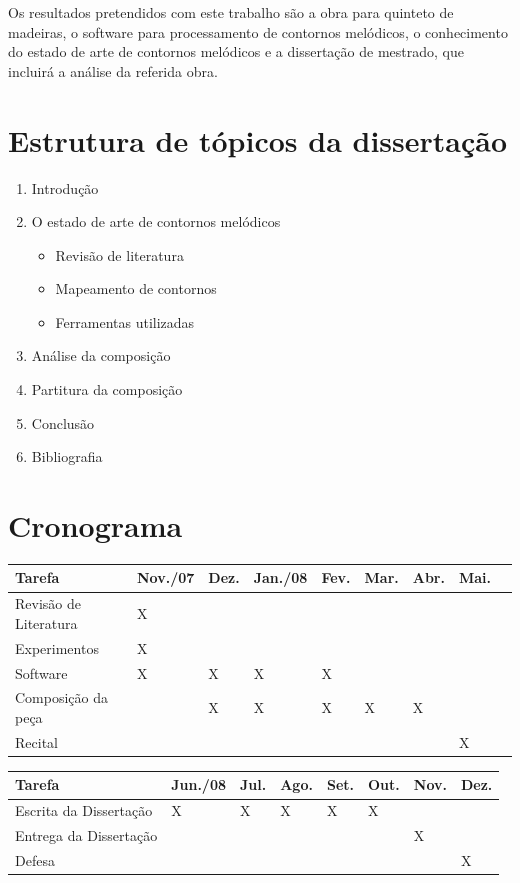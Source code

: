 \documentclass{article}
\begin{document}
Os resultados pretendidos com este trabalho são a obra para quinteto
de madeiras, o software para processamento de contornos melódicos, o
conhecimento do estado de arte de contornos melódicos e a dissertação
de mestrado, que incluirá a análise da referida obra.

\section{Estrutura de tópicos da dissertação}
\label{sec:estrutura-de-topicos}

\begin{enumerate}
\item Introdução
\item O estado de arte de contornos melódicos
  \begin{itemize}
  \item Revisão de literatura
  \item Mapeamento de contornos
  \item Ferramentas utilizadas
  \end{itemize}
\item Análise da composição
\item Partitura da composição
\item Conclusão
\item Bibliografia
\end{enumerate}

\section{Cronograma}
\label{sec:cronograma}

\begin{table}[h]
  \begin{tabular}{lllllllll}
    \hline
    Tarefa & Nov./07 & Dez. & Jan./08 & Fev. & Mar. & Abr. & Mai. \\
    \hline
    Revisão de Literatura & X &  &  & & & & & \\
    Experimentos & X & & & & & & & \\
    Software & X & X & X & X & & & &  \\
    Composição da peça & & X & X & X & X & X \\
    Recital & &  & & & & & X \\
    \hline
  \end{tabular}
\end{table}
\begin{table}[h]
  \begin{tabular}{llllllll}
    \hline
    Tarefa & Jun./08 & Jul. & Ago. & Set. & Out. & Nov. & Dez. \\
    \hline
    Escrita da Dissertação & X & X & X & X & X & & \\
    Entrega da Dissertação & & & & & & X & \\
    Defesa & & & & & & & X \\
    \hline
  \end{tabular}

  \label{tab:cronograma}
\end{table}
\end{document}
